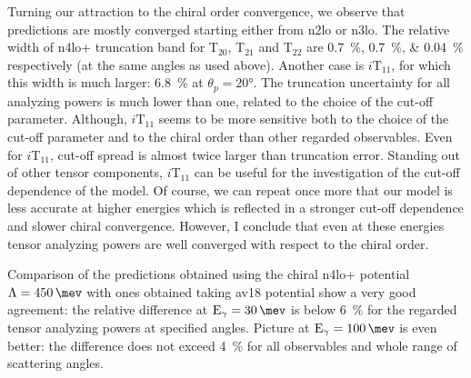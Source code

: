     Turning our attraction to the chiral order convergence, we
    observe that predictions are mostly converged starting either from \gls{n2lo} or \gls{n3lo}.
    The relative width of \gls{n4lo+} truncation band 
    for T$_{20}$, T$_{21}$ and T$_{22}$
    are \SIlist{0.7; 0.7; 0.04}{\percent} respectively (at the same angles as used above).
    Another case is $i\text{T}_{11}$, for which this width is much larger: \SI{6.8}{\percent} at $\theta_p = \ang{20}$.
    The truncation uncertainty for all analyzing powers is much lower than one,
    related to the choice of the cut-off parameter.
    Although, $i\text{T}_{11}$ seems to be more sensitive both
    to the choice of the cut-off parameter and to the chiral order than other regarded observables.
    Even for $i\text{T}_{11}$, cut-off spread is almost twice larger than truncation error.
    Standing out of other tensor components, $i\text{T}_{11}$ can be useful for the investigation of 
    the cut-off dependence of the model.
    Of course, we can repeat once more that 
    our model is less accurate at higher energies which is reflected
    in a stronger cut-off dependence and slower chiral convergence.
    However, I conclude that even at these energies tensor analyzing powers are
    well converged with respect to the chiral order.

    Comparison of the predictions obtained using the chiral \gls{n4lo+} potential
    $\Lambda = \SI{450}{\mev}$ with ones obtained taking \gls{av18} potential
    show a very good agreement: the relative difference at $\text{E}_\gamma=\SI{30}{\mev}$
    is below \SI{6}{\percent} for the regarded tensor analyzing powers at specified angles.
    Picture at  $\text{E}_\gamma=\SI{100}{\mev}$ is even better: the difference does not exceed 
    \SI{4}{\percent} for all observables and whole range of scattering angles.


